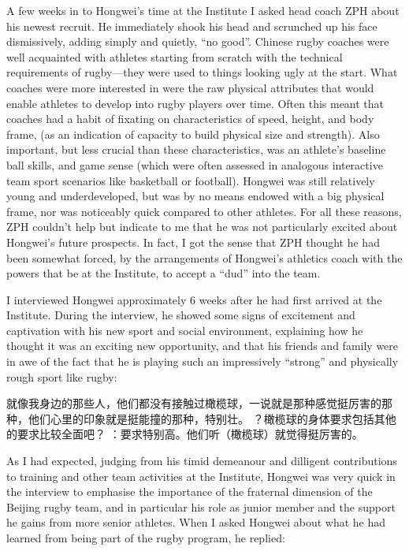 A few weeks in to Hongwei’s time at the Institute I asked head coach ZPH about his newest recruit.  He immediately shook his head and scrunched up his face dismissively, adding simply and quietly, ``no good''.  Chinese rugby coaches were well acquainted with athletes starting from scratch with the technical requirements of rugby—they were used to things looking ugly at the start.  What coaches were more interested in were the raw physical attributes that would enable athletes to develop into rugby players over time.  Often this meant that coaches had a habit of fixating on characteristics of speed, height, and body frame, (as an indication of capacity to build physical size and strength).  Also important, but less crucial than these characteristics, was an athlete’s baseline ball skills, and game sense (which were often assessed in analogous interactive team sport scenarios like basketball or football).  Hongwei was still relatively young and underdeveloped, but was by no means endowed with a big physical frame, nor was noticeably quick compared to other athletes.  For all these reasons, ZPH couldn’t help but indicate to me that he was not particularly excited about Hongwei's future prospects.  In fact, I got the sense that ZPH thought he had been somewhat forced, by the arrangements of Hongwei’s athletics coach with the powers that be at the Institute, to accept a ``dud'' into the team.

I interviewed Hongwei approximately 6 weeks after he had first arrived at the Institute.  During the interview, he showed some signs of excitement and captivation with his new sport and social environment, explaining how he thought it was an exciting new opportunity, and that his friends and family were in awe of the fact that he is playing such an impressively ``strong'' and physically rough sport like rugby:

就像我身边的那些人，他们都没有接触过橄榄球，一说就是那种感觉挺厉害的那种，他们心里的印象就是挺能撞的那种，特别壮。
？橄榄球的身体要求包括其他的要求比较全面吧？
：要求特别高。他们听（橄榄球）就觉得挺厉害的。

As I had expected, judging from his timid demeanour and dilligent contributions to training and other team activities at the Institute, Hongwei was very quick in the interview to emphasise the importance of the fraternal dimension of the Beijing rugby team, and in particular his role as junior member and the support he gains from more senior athletes.  When I asked Hongwei about what he had learned from being part of the rugby program, he replied:


